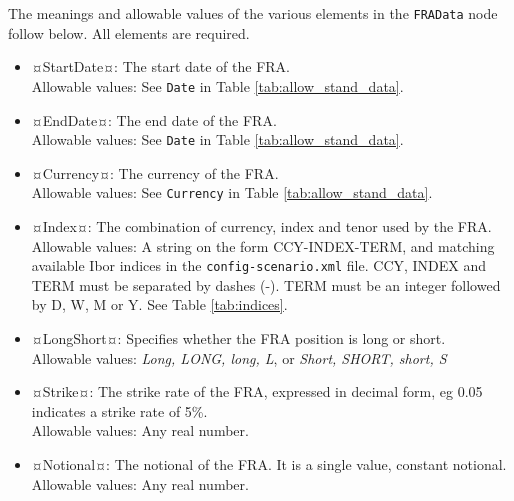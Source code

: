 The meanings and allowable values of the various elements in the \lstinline!FRAData!  node follow below.  All elements are required.

\begin{itemize}
\item ¤StartDate¤: The start date of the FRA. \\ Allowable values:  See \lstinline!Date! in Table \ref{tab:allow_stand_data}.
\item ¤EndDate¤: The end date of the FRA.  \\ Allowable values:  See \lstinline!Date! in Table \ref{tab:allow_stand_data}.
\item ¤Currency¤: The currency of the FRA.  \\ Allowable values:  See \lstinline!Currency! in Table \ref{tab:allow_stand_data}.
\item ¤Index¤: The combination of currency, index and tenor used by the FRA. \\ Allowable values:  A string on the form CCY-INDEX-TERM, and matching available Ibor indices in the {\tt config-scenario.xml} file. CCY, INDEX and TERM must be separated by dashes (-). TERM must be an integer followed by D, W, M or Y. See Table \ref{tab:indices}.
\item ¤LongShort¤: Specifies whether the FRA position is long or short.  \\ Allowable values:  \emph{Long, LONG, long, L}, or \emph{Short, SHORT, short, S}
\item ¤Strike¤: The  strike rate of the FRA, expressed in decimal form, eg 0.05 indicates a strike rate of 5\%.  \\ Allowable values:  Any real number.
\item ¤Notional¤: The notional of the FRA. It is a single value, constant notional.  \\ Allowable values:  Any real number.

\end{itemize}




